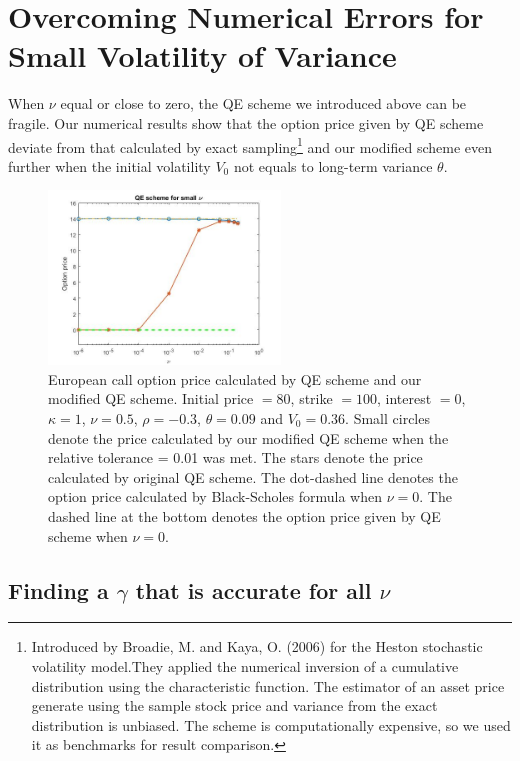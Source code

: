 \documentclass{ws-ijfe}
\begin{document}
\section{Overcoming Numerical Errors for Small Volatility of Variance}

When $\nu$ equal or close to zero, the QE scheme we introduced above can be fragile. Our numerical results show that the option price given by QE scheme deviate from that calculated by exact sampling\footnote{Introduced by Broadie, M. and Kaya, O. (2006) for the Heston stochastic volatility model.They applied the numerical inversion of a cumulative distribution using the characteristic function. The estimator of an asset price generate using the sample stock price and variance from the exact distribution is unbiased. The scheme is computationally expensive, so we used it as benchmarks for result comparison.} and our modified scheme even further when the initial volatility $V_0$ not equals to long-term variance $\theta$. %
\begin{figure}[h]
\centering
\includegraphics[width=0.55\textwidth]{FigureIn2_3_1}
\caption{European call option price calculated by QE scheme and our modified QE scheme. Initial price $=80$, strike $=100$, interest $=0$, $\kappa=1$, $\nu=0.5$, $\rho=-0.3$, $\theta=0.09$ and $V_0=0.36$. Small circles denote the price calculated by our modified QE scheme when the relative tolerance = 0.01 was met. The stars denote the price calculated by original QE scheme. The dot-dashed line denotes the option price calculated by Black-Scholes formula when $\nu=0$. The dashed line at the bottom denotes the option price given by QE scheme when $\nu=0$. }
\end{figure}

\subsection{Finding a $\gamma$ that is accurate for all $\nu$}\label{se:findGamma}
\end{document}

